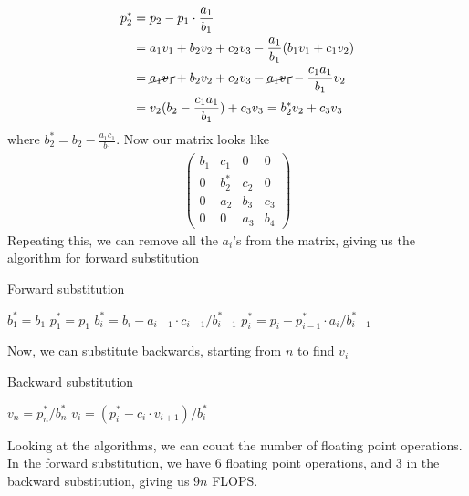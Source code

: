 \documentclass{article}
\newcommand\ppmat[1]{\begin{pmatrix}#1\end{pmatrix}}
\begin{document}
\begin{align*}
  p_2^* &= p_2 - p_1\cdot\frac{a_1}{b_1}\\
  &= a_1v_1 + b_2v_2 + c_2v_3 - \frac{a_1}{b_1}(b_1v_1 + c_1v_2)\\
  &= \cancel{a_1v_1} + b_2v_2 + c_2v_3 - \cancel{a_1v_1}-\frac{c_1a_1}{b_1}v_2\\
  &= v_2(b_2-\frac{c_1a_1}{b_1}) + c_3v_3 = b_2^*v_2 + c_3v_3
\end{align*}
where $b_2^* = b_2-\tfrac{a_1c_1}{b_1}$. Now our matrix looks like
\begin{align*}
  \ppmat{b_1&c_1&0&0\\
    0&b_2^*&c_2&0\\
    0&a_2&b_3&c_3\\
    0&0&a_3&b_4}
\end{align*}
Repeating this, we can remove all the $a_i$'s from the matrix, giving us the algorithm for forward substitution
\begin{algorithm}[H]
\small
\caption{Forward substitution}\label{alg:tri_forward}
\begin{algorithmic}[1]
\State $b_1^* = b_1$
\State $p_1^* = p_1$
\State $b_i^* = b_i - a_{i-1}\cdot c_{i-1}/b_{i-1}^*$
\State $p_i^* = p_i - p_{i-1}^*\cdot a_i/b_{i-1}^*$
\EndFor
\end{algorithmic}
\end{algorithm}
Now, we can substitute backwards, starting from $n$ to find $v_i$
\begin{algorithm}[H]
\small
\caption{Backward substitution}\label{alg:tri_backward}
\begin{algorithmic}[1]
\State $v_n = p_n^*/b_n^*$
\State $v_i = (p_i^*-c_i\cdot v_{i+1})/b_i^*$
\EndFor
\end{algorithmic}
\end{algorithm}
Looking at the algorithms, we can count the number of floating point operations. In the forward substitution, we have 6 floating point operations, and 3 in the backward substitution, giving us $9n$ FLOPS.
\end{document}
